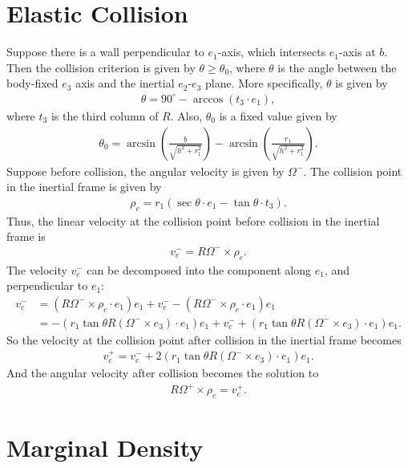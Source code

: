 \documentclass[10pt]{article}
\begin{document}
\section{Elastic Collision}
Suppose there is a wall perpendicular to $e_1$-axis, which intersects $e_1$-axis at $b$.
Then the collision criterion is given by $\theta \geq \theta_0$, where $\theta$ is the angle between the body-fixed $e_3$ axis and the inertial $e_2$-$e_3$ plane.
More specifically, $\theta$ is given by
\begin{align}
	\theta = 90^\circ - \arccos(t_3 \cdot e_1),
\end{align}
where $t_3$ is the third column of $R$.
Also, $\theta_0$ is a fixed value given by
\begin{align}
	\theta_0 = \arcsin\left(\frac{b}{\sqrt{h^2+r_1^2}}\right) - \arcsin\left(\frac{r_1}{\sqrt{h^2+r_1^2}}\right).
\end{align}
Suppose before collision, the angular velocity is given by $\Omega^-$.
The collision point in the inertial frame is given by
\begin{align}
	\rho_c = r_1 (\sec\theta\cdot e_1 - \tan\theta \cdot t_3).
\end{align}
Thus, the linear velocity at the collision point before collision in the inertial frame is
\begin{align}
	v_c^- = R\Omega^- \times \rho_c.
\end{align}
The velocity $v_c^-$ can be decomposed into the component along $e_1$, and perpendicular to $e_1$:
\begin{align}
	v_c^- &= (R\Omega^-\times\rho_c \cdot e_1)e_1 + v_c^- - (R\Omega^-\times\rho_c \cdot e_1)e_1 \nonumber \\
	&= -\left(r_1\tan\theta R(\Omega^-\times e_3)\cdot e_1\right)e_1 + v_c^- + \left(r_1\tan\theta R(\Omega^-\times e_3)\cdot e_1\right)e_1.
\end{align}
So the velocity at the collision point after collision in the inertial frame becomes
\begin{align}
	v_c^+ = v_c^- + 2(r_1\tan\theta R(\Omega^-\times e_3)\cdot e_1) e_1.
\end{align}
And the angular velocity after collision becomes the solution to
\begin{align}
	R\Omega^+ \times \rho_c = v_c^+.
\end{align}

\section{Marginal Density}
\end{document}
